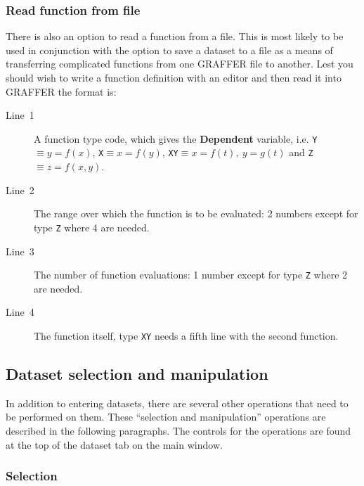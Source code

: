 \documentclass[11pt,twoside,english]{article}
\begin{document}
\subsubsection{Read function from file}

There is also an option to read a function from a file. This is most
likely to be used in conjunction with the option to save a dataset to a
file as a means of transferring complicated functions from one GRAFFER
file to another. Lest you should wish to write a function definition
with an editor and then read it into GRAFFER the format is:

\begin{description}
\item [Line~1]A function type code, which gives the \textbf{Dependent}
  variable, i.e. \texttt{Y}$\equiv y=f(x)$, \texttt{X$\equiv x=f(y)$},
  \texttt{XY$\equiv x=f(t),\: y=g(t)$} and \texttt{Z}$\equiv z=f(x,y)$.
\item [Line~2]The range over which the function is to be evaluated: 2
  numbers except for type \texttt{Z} where 4 are needed.
\item [Line~3]The number of function evaluations: 1 number except for
  type \texttt{Z} where 2 are needed.
\item [Line~4]The function itself, type \texttt{XY} needs a fifth line
  with the second function.
\end{description}

\subsection{Dataset selection and manipulation}

In addition to entering datasets, there are several other operations
that need to be performed on them. These {}``selection and
manipulation'' operations are described in the following
paragraphs. The controls for the operations are found at the top of the
\textsf{dataset} tab on the main window.


\subsubsection{Selection}
\end{document}
